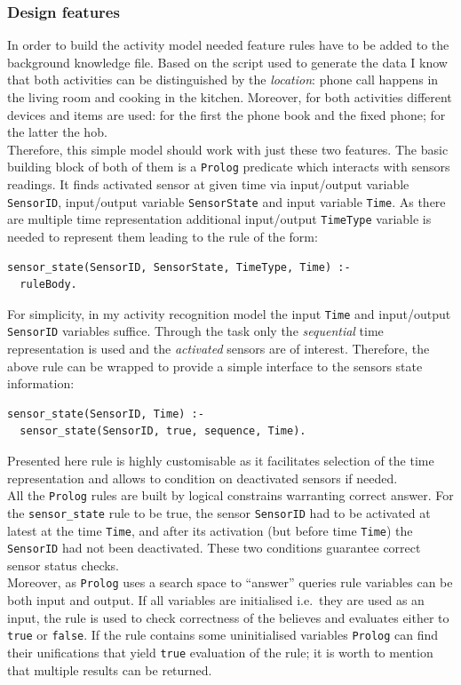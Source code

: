 \documentclass[10pt, a4paper, pdflatex, leqno, twoside, openright]{report}
\begin{document}
      \subsubsection{Design features}
In order to build the activity model needed feature rules have to be added to the background knowledge file. Based on the script used to generate the data I know that both activities can be distinguished by the \emph{location}: phone call happens in the living room and cooking in the kitchen. Moreover, for both activities different devices and items are used: for the first the phone book and the fixed phone; for the latter the hob.\\

Therefore, this simple model should work with just these two features. The basic building block of both of them is a \texttt{Prolog} predicate which interacts with sensors readings. It finds activated sensor at given time via input/output variable \texttt{SensorID}, input/output variable \texttt{SensorState} and input variable \texttt{Time}. As there are multiple time representation additional input/output \texttt{TimeType} variable is needed to represent them leading to the rule of the form:\\
\begin{verbatim}
sensor_state(SensorID, SensorState, TimeType, Time) :-
  ruleBody.
\end{verbatim}
For simplicity, in my activity recognition model the input \texttt{Time} and input/output \texttt{SensorID} variables suffice. Through the task only the \emph{sequential} time representation is used and the \emph{activated} sensors are of interest. Therefore, the above rule can be wrapped to provide a simple interface to the sensors state information:\\
\begin{verbatim}
sensor_state(SensorID, Time) :-
  sensor_state(SensorID, true, sequence, Time).
\end{verbatim}
Presented here rule is highly customisable as it facilitates selection of the time representation and allows to condition on deactivated sensors if needed.\\

All the \texttt{Prolog} rules are built by logical constrains warranting correct answer. For the \texttt{sensor\_state} rule to be true, the sensor \texttt{SensorID} had to be activated at latest at the time \texttt{Time}, and after its activation (but before time \texttt{Time}) the \texttt{SensorID} had not been deactivated. These two conditions guarantee correct sensor status checks.\\
Moreover, as \texttt{Prolog} uses a search space to ``answer'' queries rule variables can be both input and output. If all variables are initialised i.e.\ they are used as an input, the rule is used to check correctness of the believes and evaluates either to \texttt{true} or \texttt{false}. If the rule contains some uninitialised variables \texttt{Prolog} can find their unifications that yield \texttt{true} evaluation of the rule; it is worth to mention that multiple results can be returned.\\
\end{document}
